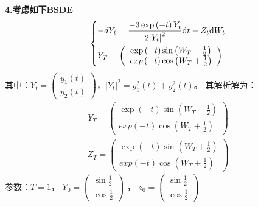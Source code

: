 	\par
	\textbf{4.考虑如下BSDE}
			\begin{equation*}
			\centering
			\left\{\begin{lgathered}
			{ - d{Y_t} = \frac{{ - 3\exp \left( { - t} \right){Y_t}}}{{2{{\left| {{Y_t}} \right|}^2}}}\mathrm{d}t - {Z_t}\mathrm{d}{W_t}}\\
			{{Y_T} = \left( {\begin{array}{*{20}{c}}
			{\exp \left( { - t} \right)\sin \left( {{W_T} + \frac{1}{2}} \right)}\\
			{exp\left( { - t} \right)\cos \left( {{W_T} + \frac{1}{2}} \right)}
			\end{array}} \right)}
			\end{lgathered} \right.
			\end{equation*}
	其中：\begin{math}{Y_t} = \left( \begin{smallmatrix}
	{y_1}\left( t \right)\\
	{y_2}\left( t \right)
	\end{smallmatrix} \right)\end{math}，${\left| {{Y_t}} \right|^2} = y_1^2\left( t \right) + y_2^2\left( t \right)$。
	 其解析解为：
	 \begin{align*}
	 {{Y_T} = \left( {\begin{array}{*{20}{c}}
	{\exp \left( { - t} \right)\sin \left( {{W_T} + \frac{1}{2}} \right)}\\
	{exp\left( { - t} \right)\cos \left( {{W_T} + \frac{1}{2}} \right)}
	\end{array}} \right)}\end{align*}
	\begin{align*}
	{{Z_T} = \left( {\begin{array}{*{20}{c}}
	{\exp \left( { - t} \right)\sin \left( {{W_T} + \frac{1}{2}} \right)}\\
	{exp\left( { - t} \right)\cos \left( {{W_T} + \frac{1}{2}} \right)}
	\end{array}} \right)}\end{align*}
	 参数：$T=1$， \begin{math}Y_0 = \left( \begin{smallmatrix}
	\sin\frac 12\\ \cos\frac 12
	\end{smallmatrix} \right)\end{math}
	， \begin{math}z_0 = \left( \begin{smallmatrix}
	\sin\frac 12\\ \cos\frac 12
	\end{smallmatrix} \right)\end{math}

